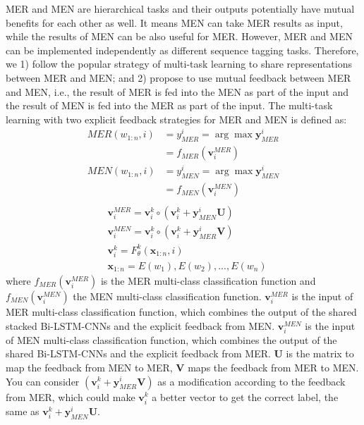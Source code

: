MER and MEN are hierarchical tasks and their outputs potentially have mutual benefits for each other as well. It means MEN can take MER results as input, while the results of MEN can be also useful for MER. However, MER and MEN can be implemented independently as different sequence tagging tasks.  
Therefore, we 1) follow the popular strategy of multi-task learning to share representations between MER and MEN; and 2) propose to use mutual feedback between MER and MEN, i.e., the result of MER is fed into the MEN as part of the input and the result of MEN is fed into the MER as part of the input. The multi-task learning with two explicit feedback strategies for MER and MEN is defined as:
\begin{equation*}
\begin{split}
MER(w_{1:n},i) &= y_{MER}^{i}=\arg\max\mathbf{y}_{MER}^{i}\\
&= f_{MER}(\mathbf{v}_i^{MER})\\
MEN(w_{1:n},i) &= y_{MEN}^{i}=\arg\max\mathbf{y}_{MEN}^{i}\\
& = f_{MEN}(\mathbf{v}_i^{MEN})\\
\end{split}
\end{equation*}
\vspace{-0.1in}
\begin{equation*}
\begin{split}
&\mathbf{v}_i^{MER} = \mathbf{v}_i^k \circ (\mathbf{v}_i^k+\mathbf{y}_{MEN}^{i}\mathbf{U})\\
&\mathbf{v}_i^{MEN} = \mathbf{v}_i^k \circ  (\mathbf{v}_i^k+\mathbf{y}_{MER}^{i}\mathbf{V})\\
&\mathbf{v}_i^k = F_{\theta}^k(\mathbf{x}_{1:n},i)\\
&\mathbf{x}_{1:n} = E(w_1), E(w_2), ..., E(w_n)
\end{split}
\end{equation*}
where $f_{MER}(\mathbf{v}_i^{MER})$ is the MER multi-class classification function and $f_{MEN}(\mathbf{v}_i^{MEN})$ the MEN multi-class classification function. $\mathbf{v}_i^{MER}$ is the input of MER multi-class classification function, which combines the output of the shared stacked Bi-LSTM-CNNs and the explicit feedback from MEN.  $\mathbf{v}_i^{MEN}$ is the input of MEN multi-class classification function, which combines the output of the shared Bi-LSTM-CNNs and the explicit feedback from MER. $\mathbf{U}$ is the matrix to map the feedback from MEN to MER, $\mathbf{V}$ maps the  feedback from MER to MEN. You can consider $(\mathbf{v}_i^k+\mathbf{y}_{MER}^{i}\mathbf{V})$ as a modification according to the feedback from MER, which could make $\mathbf{v}_i^k$ a better vector to get the correct label, the same as $\mathbf{v}_i^k+\mathbf{y}_{MEN}^{i}\mathbf{U}$.

